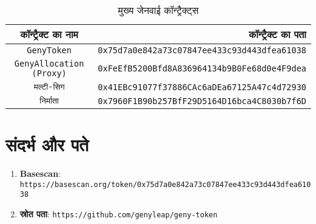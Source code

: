 \documentclass[a4paper,12pt,openany]{book}
\begin{document}
\begin{table}[h]
\centering
\caption*{मुख्य जेनवाई कॉन्ट्रैक्ट्स}
\small
\begin{tabular}{c r}
\hline
\textbf{कॉन्ट्रैक्ट का नाम} & \textbf{कॉन्ट्रैक्ट का पता} \\
\hline
\texttt{GenyToken} & {\texttt{0x75d7a0e842a73c07847ee433c93d443dfea61038}} \\
\texttt{GenyAllocation (Proxy)} & {\texttt{0xFeEfB5200Bfd8A836964134b9B0Fe68d0e4F9dea}} \\
\texttt{मल्टी-सिग} & {\texttt{0x41EBc91077f37886CAc6aDEa67125A47c4d72930}} \\
\texttt{निर्माता} & {\texttt{0x7960F1B90b257BfF29D5164D16bca4C8030b7f6D}} \\
\hline
\end{tabular}
\end{table}

\section*{संदर्भ और पते}

\begin{enumerate}
    \item \textbf{Basescan}: \texttt{https://basescan.org/token/0x75d7a0e842a73c07847ee433c93d443dfea61038}
    \item \textbf{स्रोत पता}: \texttt{https://github.com/genyleap/geny-token}
\end{enumerate}
\end{document}
